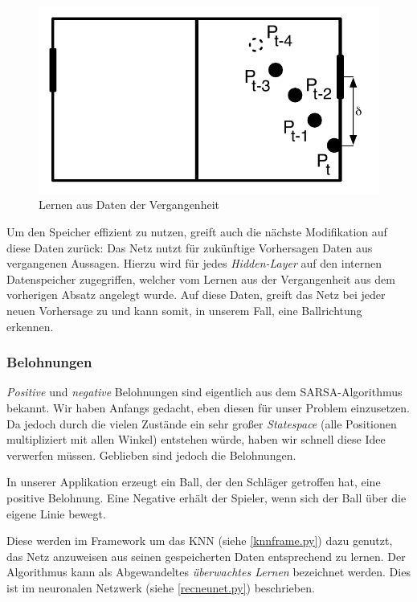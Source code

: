 \documentclass[12pt,twoside]{article}
\theoremstyle{plain}
\theoremstyle{definition}
\theoremstyle{remark}
\begin{document}
\begin{figure}[hbtp]
	 \centerline{\includegraphics[]{delayed.pdf}}
	 {\caption{Lernen aus Daten der Vergangenheit}\label{fig:delayedlearning}}
\end{figure}


Um den Speicher effizient zu nutzen, greift auch die nächste Modifikation auf diese Daten zurück: Das Netz nutzt für zukünftige Vorhersagen Daten aus vergangenen Aussagen. Hierzu wird für jedes \textit{Hidden-Layer} auf den internen Datenspeicher zugegriffen, welcher vom Lernen aus der Vergangenheit aus dem vorherigen Absatz angelegt wurde. Auf diese Daten, greift das Netz bei jeder neuen Vorhersage zu und kann somit, in unserem Fall, eine Ballrichtung erkennen. 


\subsubsection{Belohnungen}
\label{rewards}

\textit{Positive} und \textit{negative} Belohnungen sind eigentlich aus dem SARSA-Algorithmus bekannt. Wir haben Anfangs gedacht, eben diesen für unser Problem einzusetzen. Da jedoch durch die vielen Zustände ein sehr großer \textit{Statespace} (alle Positionen multipliziert mit allen Winkel) entstehen würde, haben wir schnell diese Idee verwerfen müssen. Geblieben sind jedoch die Belohnungen. 

In unserer Applikation erzeugt ein Ball, der den Schläger getroffen hat, eine positive Belohnung. Eine Negative erhält der Spieler, wenn sich der Ball über die eigene Linie bewegt.

Diese werden im Framework um das KNN (siehe \ref{knnframe.py}) dazu genutzt, das Netz anzuweisen aus seinen gespeicherten Daten entsprechend zu lernen. Der Algorithmus kann als Abgewandeltes \textit{überwachtes Lernen} bezeichnet werden. Dies ist im neuronalen Netzwerk (siehe \ref{recneunet.py}) beschrieben.
\end{document}
